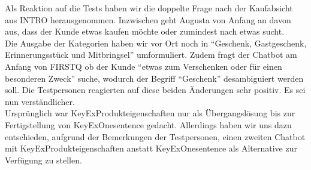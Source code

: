 Als Reaktion auf die Tests haben wir die doppelte Frage nach der Kaufabsicht aus INTRO herausgenommen. Inzwischen geht Augusta von Anfang an davon aus, dass der Kunde etwas kaufen möchte oder zumindest nach etwas sucht.\\
Die Ausgabe der Kategorien haben wir vor Ort noch in "`Geschenk, Gastgeschenk, Erinnerungsstück und Mitbringsel"' umformuliert. Zudem fragt der Chatbot am Anfang von FIRSTQ ob der Kunde "`etwas zum Verschenken oder für einen besonderen Zweck"' suche, wodurch der Begriff "`Geschenk"' desambiguiert werden soll. Die Testpersonen reagierten auf diese beiden Änderungen sehr positiv. Es sei nun verständlicher. \\
Ursprünglich war KeyExProdukteigenschaften nur als Übergangslösung bis zur Fertigstellung von KeyExOnesentence gedacht. Allerdings haben wir uns dazu entschieden, aufgrund der Bemerkungen der Testpersonen, einen zweiten Chatbot mit KeyExProdukteigenschaften anstatt KeyExOnesentence als Alternative zur Verfügung zu stellen.

